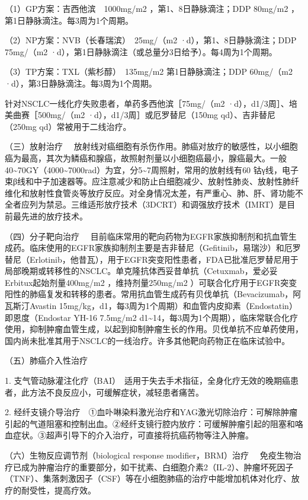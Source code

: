 （1）GP方案：吉西他滨　1000mg/m{2} ，第1、8日静脉滴注；DDP 80mg/m{2}
，第1日静脉滴注。每3周为1个周期。

（2）NP方案：NVB（长春瑞滨）　25mg/（m{2} ·d），第1、8日静脉滴注；DDP
75mg/（m{2} ·d），第1日静脉滴注（或总量分3日给予）。每4周为1个周期。

（3）TP方案：TXL（紫杉醇）　135mg/m{2} 第1日静脉滴注；DDP 60mg/（m{2}
·d），第3日静脉滴注。每3周为1个周期。

针对NSCLC一线化疗失败患者，单药多西他滨［75mg/（m{2}
·d），d1/3周］、培美曲赛［500mg/（m{2} ·d），d1/3周］或厄罗替尼（150mg
qd）、吉非替尼（250mg qd）常被用于二线治疗。

{（三）放射治疗}
　放射线对癌细胞有杀伤作用。肺癌对放疗的敏感性，以小细胞癌为最高，其次为鳞癌和腺癌，故照射剂量以小细胞癌最小，腺癌最大。一般40\textasciitilde{}70GY（4000\textasciitilde{}7000rad）为宜，分5\textasciitilde{}7周照射，常用的放射线有{60}
钴γ线，电子束β线和中子加速器等。应注意减少和防止白细胞减少、放射性肺炎、放射性肺纤维化和放射性食管炎等放疗反应。对全身情况太差，有严重心、肺、肝、肾功能不全者应列为禁忌。三维适形放疗技术（3DCRT）和调强放疗技术（IMRT）是目前最先进的放疗技术。

{（四）分子靶向治疗}
　目前临床常用的靶向药物为EGFR家族抑制剂和抗血管生成药。临床使用的EGFR家族抑制剂主要是吉非替尼（Gefitinib，易瑞沙）和厄罗替尼（Erlotinib，他昔瓦），用于EGFR突变阳性患者，FDA已批准厄罗替尼用于局部晚期或转移性的NSCLC。单克隆抗体西妥昔单抗（Cetuxmab，爱必妥Erbitux起始剂量400mg/m{2}
，维持剂量250mg/m{2}
）可联合化疗用于EGFR突变阳性的肺癌复发和转移的患者。常用抗血管生成药有贝伐单抗（Bevacizumab，阿瓦斯汀Avastin
15mg/kg，d1，每3周为1个周期）和血管内皮抑素（Endostatin）即恩度（Endostar
YH-16 7.5mg/m{2}
d1\textasciitilde{}14，每3周为1个周期），临床常联合化疗使用，抑制肿瘤血管生成，以起到抑制肿瘤生长的作用。贝伐单抗不应单药使用，国内尚未批准其用于NSCLC的一线治疗。许多其他靶向药物正在临床试验中。

{（五）肺癌介入性治疗}

1.
支气管动脉灌注化疗（BAI）　适用于失去手术指征，全身化疗无效的晚期癌患者，此方法不良反应小，可缓解症状，减轻患者痛苦。

2.
经纤支镜介导治疗　①血卟啉染料激光治疗和YAG激光切除治疗：可解除肿瘤引起的气道阻塞和控制出血。②经纤支镜行腔内放疗：可缓解肿瘤引起的阻塞和咯血症状。③超声引导下的介入治疗，可直接将抗癌药物等注入肿瘤。

{（六）生物反应调节剂（biological response modifier，BRM）治疗}
　免疫生物治疗已成为肿瘤治疗的重要部分，如干扰素、白细胞介素2（IL-2）、肿瘤坏死因子（TNF）、集落刺激因子（CSF）等在小细胞肺癌的治疗中能增加机体对化疗、放疗的耐受性，提高疗效。

